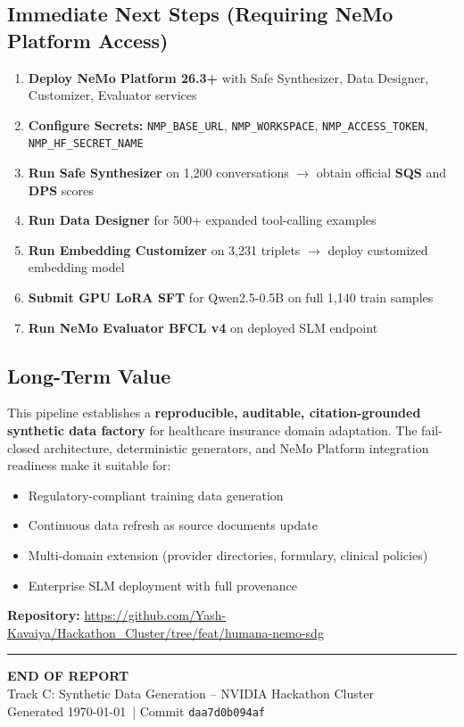 \documentclass[11pt,a4paper]{article}
\begin{document}
\subsection{Immediate Next Steps (Requiring NeMo Platform Access)}
\begin{enumerate}[label=\textcolor{nvidiaGreen}{\textbf{\arabic.}}, leftmargin=*]
    \item \textbf{Deploy NeMo Platform 26.3+} with Safe Synthesizer, Data Designer, Customizer, Evaluator services
    \item \textbf{Configure Secrets:} \texttt{NMP\_BASE\_URL}, \texttt{NMP\_WORKSPACE}, \texttt{NMP\_ACCESS\_TOKEN}, \texttt{NMP\_HF\_SECRET\_NAME}
    \item \textbf{Run Safe Synthesizer} on 1,200 conversations $\to$ obtain official \textbf{SQS} and \textbf{DPS} scores
    \item \textbf{Run Data Designer} for 500+ expanded tool-calling examples
    \item \textbf{Run Embedding Customizer} on 3,231 triplets $\to$ deploy customized embedding model
    \item \textbf{Submit GPU LoRA SFT} for Qwen2.5-0.5B on full 1,140 train samples
    \item \textbf{Run NeMo Evaluator BFCL v4} on deployed SLM endpoint
\end{enumerate}

\subsection{Long-Term Value}
This pipeline establishes a \textbf{reproducible, auditable, citation-grounded synthetic data factory} for healthcare insurance domain adaptation. The fail-closed architecture, deterministic generators, and NeMo Platform integration readiness make it suitable for:
\begin{itemize}[label=\textcolor{nvidiaGreen}{$\triangleright$}, leftmargin=*]
    \item Regulatory-compliant training data generation
    \item Continuous data refresh as source documents update
    \item Multi-domain extension (provider directories, formulary, clinical policies)
    \item Enterprise SLM deployment with full provenance
\end{itemize}

\medskip
\noindent\textbf{Repository:} \url{https://github.com/Yash-Kavaiya/Hackathon_Cluster/tree/feat/humana-nemo-sdg}

\vfill
\begin{center}
{\color{nvidiaGreen}\rule{0.8\linewidth}{2pt}}
\vspace{0.5cm}
{\Large\color{nvidiaWhite}\textbf{END OF REPORT}}\\
\vspace{0.3cm}
{\color{nvidiaBlue}Track C: Synthetic Data Generation -- NVIDIA Hackathon Cluster}\\
{\color{nvidiaLightGray}Generated \today\ | Commit \texttt{daa7d0b094af}}
\end{center}

\label{LastPage}
\end{document}
